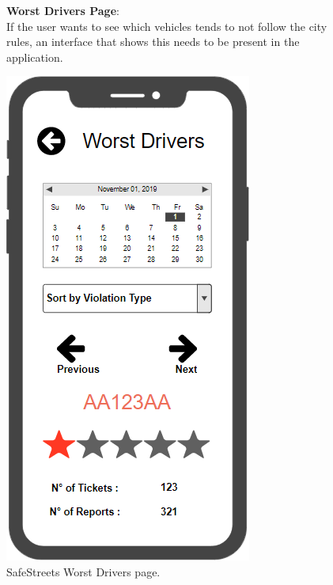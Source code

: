 \begin{figure}
	\begin{flushleft}
		\textbf{Worst Drivers Page}:\\
		If the user wants to see which vehicles tends to not follow the city rules, an interface that shows this needs to be present in the application.
	\end{flushleft}
	\centering
	\includegraphics[width=0.6\linewidth]{images/mockups/vehicles}
	\caption{SafeStreets Worst Drivers page.}
	\label{fig:vehicles}
\end{figure}
\clearpage
